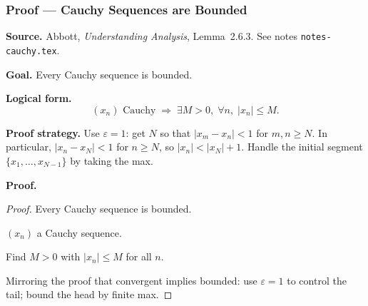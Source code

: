 
\clearpage
{}
\hypertarget{proof-RA-ABB-P-cauchy-bounded}{}

\subsubsection[Cauchy Sequences are Bounded]{Proof --- Cauchy Sequences are Bounded}

\bigskip

\noindent
\textbf{Source.}
Abbott, \emph{Understanding Analysis}, Lemma~2.6.3.
See notes \texttt{notes-cauchy.tex}.

\vspace{0.75em}

\noindent
\textbf{Goal.}
Every Cauchy sequence is bounded.

\vspace{0.75em}

\noindent
\textbf{Logical form.}
\[
  (x_n) \text{ Cauchy}
  \;\Rightarrow\;
  \exists M > 0,\; \forall n,\; |x_n| \le M.
\]

\vspace{0.75em}

\noindent
\textbf{Proof strategy.}
Use $\varepsilon = 1$: get $N$ so that $|x_m - x_n| < 1$ for $m, n \ge N$.
In particular, $|x_n - x_N| < 1$ for $n \ge N$, so $|x_n| < |x_N| + 1$.
Handle the initial segment $\{x_1, \ldots, x_{N-1}\}$ by taking the max.

\vspace{0.75em}

\noindent
\textbf{Proof.}
\begin{proof}
\Claim Every Cauchy sequence is bounded.

\Given $(x_n)$ a Cauchy sequence.

\Goal Find $M > 0$ with $|x_n| \le M$ for all $n$.

\Strategy Mirroring the proof that convergent implies bounded: use $\varepsilon = 1$
to control the tail; bound the head by finite max.

\medskip





\end{proof}

